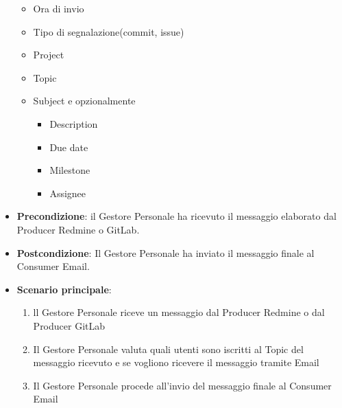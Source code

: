 \begin{itemize}
\begin{itemize}
			\item Ora di invio
			\item Tipo di segnalazione(commit, issue)
			\item Project
			\item Topic
			\item Subject e opzionalmente
		 	\begin{itemize}
				\item Description
				\item Due date
				\item Milestone
				\item Assignee
			\end{itemize}
		\end{itemize}
		\item \textbf{Precondizione}: il Gestore Personale ha ricevuto il messaggio elaborato dal Producer Redmine o GitLab.
		\item \textbf{Postcondizione}: Il Gestore Personale ha inviato il messaggio finale al Consumer Email.
		\item \textbf{Scenario principale}: 
		\begin{enumerate}
			\item ll Gestore Personale riceve un messaggio dal Producer Redmine o dal Producer GitLab
			\item Il Gestore Personale valuta quali utenti sono iscritti al Topic del messaggio ricevuto e se vogliono ricevere il messaggio tramite Email
			\item Il Gestore Personale procede all'invio del messaggio finale al Consumer Email
		\end{enumerate}
		
	\end{itemize}